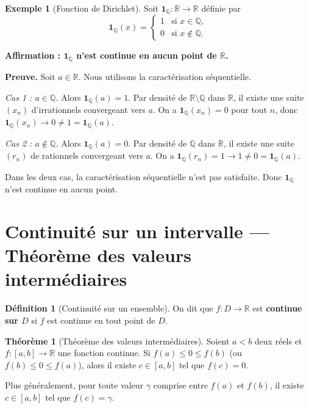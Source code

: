 \documentclass[12pt,a4paper,openany]{book}
\theoremstyle{definition}
\newtheorem{definition}{Définition}[chapter]
\newtheorem{theoreme}{Théorème}[chapter]
\newtheorem{exemple}{Exemple}[chapter]
\newcommand{\Q}{\mathbb{Q}}
\newcommand{\R}{\mathbb{R}}
\begin{document}
\begin{exemple}[Fonction de Dirichlet]\label{ex:dirichlet}
Soit $\mathbf{1}_{\Q} \colon \R \to \R$ définie par
\[
  \mathbf{1}_{\Q}(x) =
  \begin{cases}
    1 & \text{si } x \in \Q, \\
    0 & \text{si } x \notin \Q.
  \end{cases}
\]

\textbf{Affirmation : $\mathbf{1}_{\Q}$ n'est continue en aucun point de $\R$.}

\medskip
\textbf{Preuve.} Soit $a \in \R$. Nous utilisons la caractérisation séquentielle.

\emph{Cas 1 : $a \in \Q$.} Alors $\mathbf{1}_{\Q}(a) = 1$. Par densité de $\R \setminus \Q$ dans $\R$, il existe une suite $(x_n)$ d'irrationnels convergeant vers $a$. On a $\mathbf{1}_{\Q}(x_n) = 0$ pour tout $n$, donc $\mathbf{1}_{\Q}(x_n) \to 0 \neq 1 = \mathbf{1}_{\Q}(a)$.

\emph{Cas 2 : $a \notin \Q$.} Alors $\mathbf{1}_{\Q}(a) = 0$. Par densité de $\Q$ dans $\R$, il existe une suite $(r_n)$ de rationnels convergeant vers $a$. On a $\mathbf{1}_{\Q}(r_n) = 1 \to 1 \neq 0 = \mathbf{1}_{\Q}(a)$.

Dans les deux cas, la caractérisation séquentielle n'est pas satisfaite. Donc $\mathbf{1}_{\Q}$ n'est continue en aucun point.
\end{exemple}

\section{Continuité sur un intervalle — Théorème des valeurs intermédiaires}\label{sec:TVI}

\begin{definition}[Continuité sur un ensemble]\label{def:continuite-ensemble}
On dit que $f \colon D \to \R$ est \textbf{continue sur $D$} si $f$ est continue en tout point de $D$.
\end{definition}

\begin{theoreme}[Théorème des valeurs intermédiaires]\label{thm:TVI}
Soient $a < b$ deux réels et $f \colon [a, b] \to \R$ une fonction continue. Si $f(a) \leqslant 0 \leqslant f(b)$ (ou $f(b) \leqslant 0 \leqslant f(a)$), alors il existe $c \in [a, b]$ tel que $f(c) = 0$.

Plus généralement, pour toute valeur $\gamma$ comprise entre $f(a)$ et $f(b)$, il existe $c \in [a, b]$ tel que $f(c) = \gamma$.
\end{theoreme}
\end{document}
